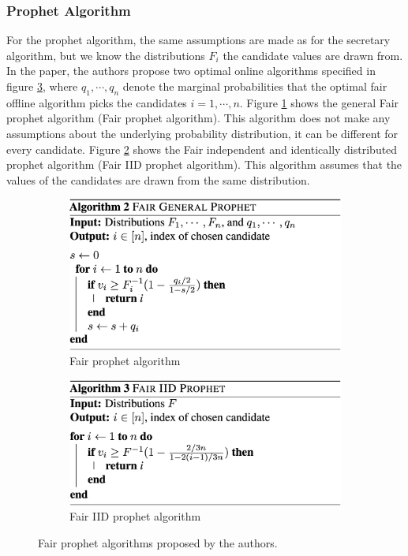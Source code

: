 \subsubsection{Prophet Algorithm}
For the prophet algorithm, the same assumptions are made as for the secretary algorithm, but we know the distributions $F_i$ the candidate values are drawn from. In the paper, the authors propose two optimal online algorithms specified in figure \ref{fig:prophetalgos}, where $q_1, \cdots, q_n$ denote the marginal probabilities that the optimal fair offline algorithm picks the candidates $i=1, \cdots, n$. Figure \ref{fig:genpro} shows the general Fair prophet algorithm (Fair prophet algorithm). This algorithm does not make any assumptions about the underlying probability distribution, it can be different for every candidate. Figure \ref{fig:iidpro} shows the Fair independent and identically distributed prophet algorithm (Fair IID prophet algorithm). This algorithm assumes that the values of the candidates are drawn from the same distribution.

\begin{figure}[h!]
    \centering
    \begin{subfigure}[t!]{0.475\textwidth}
         \centering
        \includegraphics[width=1\textwidth]{media/generalpro.png}
        \caption{Fair prophet algorithm}
        \label{fig:genpro}
    \end{subfigure}
    \hfill
    \begin{subfigure}[t!]{0.475\textwidth}
        \centering
        \includegraphics[width=1\textwidth]{media/iddpro.png}
        \caption{Fair IID prophet algorithm}
        \label{fig:iidpro}
    \end{subfigure}
    \caption{Fair prophet algorithms proposed by the authors.}
    \label{fig:prophetalgos}
\end{figure}

